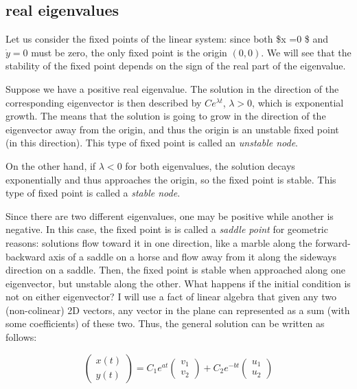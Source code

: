\documentclass[
  letterpaper,
  DIV=11,
  numbers=noendperiod]{scrreprt}
\begin{document}
\hypertarget{real-eigenvalues}{%
\subsection{real eigenvalues}\label{real-eigenvalues}}

Let us consider the fixed points of the linear system: since both
\$\dot x =0 \$ and \(\dot y = 0\) must be zero, the only fixed point is
the origin \((0,0)\). We will see that the stability of the fixed point
depends on the sign of the real part of the eigenvalue.

Suppose we have a positive real eigenvalue. The solution in the
direction of the corresponding eigenvector is then described by
\(Ce^{\lambda t}\), \(\lambda > 0\), which is exponential growth. The
means that the solution is going to grow in the direction of the
eigenvector away from the origin, and thus the origin is an unstable
fixed point (in this direction). This type of fixed point is called an
\emph{unstable node}.

On the other hand, if \(\lambda < 0\) for both eigenvalues, the solution
decays exponentially and thus approaches the origin, so the fixed point
is stable. This type of fixed point is called a \emph{stable node}.

Since there are two different eigenvalues, one may be positive while
another is negative. In this case, the fixed point is is called a
\emph{saddle point} for geometric reasons: solutions flow toward it in
one direction, like a marble along the forward-backward axis of a saddle
on a horse and flow away from it along the sideways direction on a
saddle. Then, the fixed point is stable when approached along one
eigenvector, but unstable along the other. What happens if the initial
condition is not on either eigenvector? I will use a fact of linear
algebra that given any two (non-colinear) 2D vectors, any vector in the
plane can represented as a sum (with some coefficients) of these two.
Thus, the general solution can be written as follows:

\[
\left(\begin{array}{c} x(t) \\  y(t) \end{array}\right) =C_1e^{at} \left(\begin{array}{c}v_1\\v_2\end{array}\right)+C_2 e^{-bt}\left(\begin{array}{c}u_1\\u_2\end{array}\right)
\]
\end{document}
